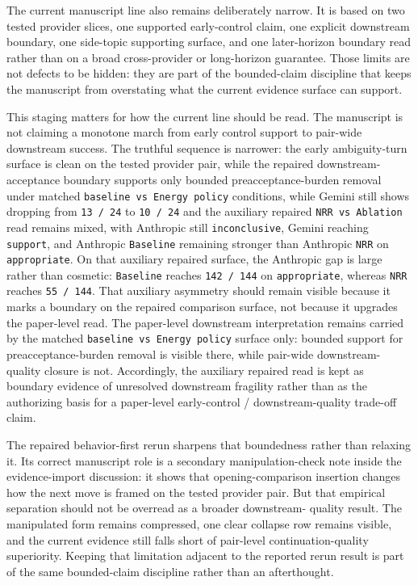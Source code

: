 \documentclass[11pt]{article}
\renewcommand{\_}{\textunderscore\hspace{0pt}}
\newcommand{\code}[1]{\path{#1}}
\begin{document}
The current manuscript line also remains deliberately narrow. It is based on
two tested provider slices, one supported early-control claim, one explicit
downstream boundary, one side-topic supporting surface, and one later-horizon
boundary read rather than on a broad cross-provider or long-horizon guarantee.
Those limits are not defects to be hidden: they are part of the bounded-claim
discipline that keeps the manuscript from overstating what the current evidence
surface can support.

This staging matters for how the current line should be read. The manuscript is
not claiming a monotone march from early control support to pair-wide
downstream success. The truthful sequence is narrower: the early ambiguity-turn
surface is clean on the tested provider pair, while the repaired downstream-
acceptance boundary supports only bounded preacceptance-burden removal under
matched \texttt{baseline vs Energy policy} conditions, while Gemini still
shows \code{accepted_direction_followthrough_present} dropping from
\texttt{13 / 24} to \texttt{10 / 24} and the auxiliary repaired
\texttt{NRR vs Ablation} read remains mixed, with Anthropic still
\texttt{inconclusive}, Gemini reaching \texttt{support}, and Anthropic
\texttt{Baseline} remaining stronger than Anthropic \texttt{NRR} on
\texttt{appropriate}. On that auxiliary repaired surface, the Anthropic gap is
large rather than cosmetic: \texttt{Baseline} reaches \texttt{142 / 144} on
\texttt{appropriate}, whereas \texttt{NRR} reaches \texttt{55 / 144}. That
auxiliary asymmetry should remain visible because it marks a boundary on the
repaired comparison surface, not because it upgrades the paper-level read. The
paper-level downstream interpretation remains carried by the matched
\texttt{baseline vs Energy policy} surface only: bounded support for
preacceptance-burden removal is visible there, while pair-wide downstream-
quality closure is not. Accordingly, the auxiliary repaired read is kept as
boundary evidence of unresolved downstream fragility rather than as the
authorizing basis for a paper-level early-control / downstream-quality trade-off
claim.

The repaired behavior-first rerun sharpens that boundedness rather than
relaxing it. Its correct manuscript role is a secondary manipulation-check note
inside the evidence-import discussion: it shows that opening-comparison
insertion changes how the next move is framed on the tested provider pair. But
that empirical separation should not be overread as a broader downstream-
quality result. The manipulated form remains compressed, one clear collapse row
remains visible, and the current evidence still falls short of pair-level
continuation-quality superiority. Keeping that limitation adjacent to the
reported rerun result is part of the same bounded-claim discipline rather than
an afterthought.
\end{document}
